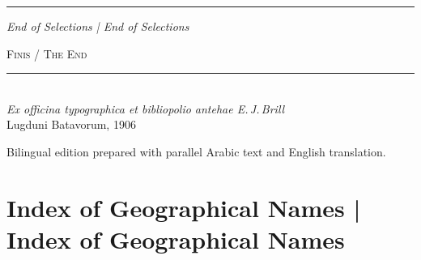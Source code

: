 \documentclass[11pt,a4paper]{article}
\newcommand{\shortline}{\noindent\rule{0.5\textwidth}{0.4pt}\par}
\begin{document}
\vspace{0.3cm}

\noindent\rule{\textwidth}{0.4pt}

\begin{center}
\textit{End of Selections | End of Selections}
\end{center}

\clearpage


\thispagestyle{empty}
\vspace*{4cm}

\begin{center}
{\large\textsc{Finis / The End}}\\[0.8cm]

\shortline\\[0.8cm]

{\small\textit{Ex officina typographica et bibliopolio antehae E.\,J.\,Brill}}\\[0.3cm]
{\small Lugduni Batavorum, 1906}

\vspace{1cm}

{\small Bilingual edition prepared with parallel Arabic text and English translation.}

\end{center}

\clearpage


\section*{Index of Geographical Names | Index of Geographical Names}
\end{document}
